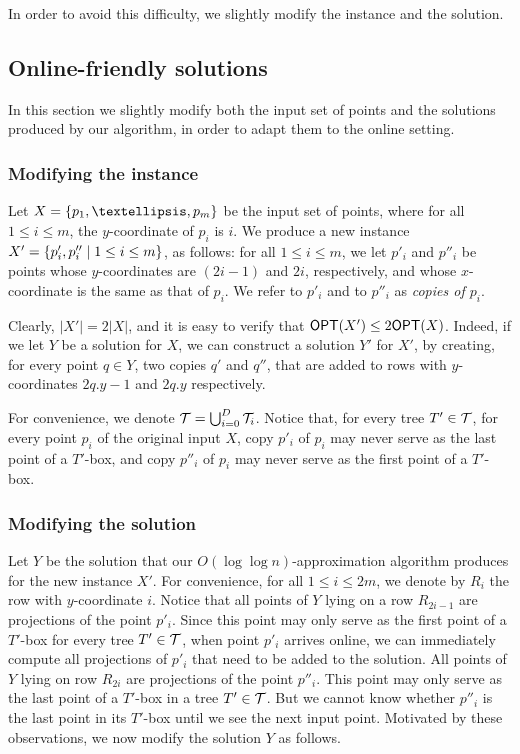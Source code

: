\documentclass[11pt]{article}
\numberwithin{equation}{section}
\theoremstyle{definition}
\theoremstyle{plain}
\begin{document}
In order to avoid this difficulty, we slightly modify the instance and the solution. 


%
%


\subsection{Online-friendly solutions}
\label{sec: online-friendly}

In this section we slightly modify both the input set of points and the solutions produced by our algorithm, in order to adapt them to the online setting.

\subsubsection{Modifying the instance}

Let $X=\set{p_1,\ldots,p_m}$ be the input set of points, where for all $1\leq i\leq m$, the $y$-coordinate of $p_i$ is $i$. We produce a new instance $X'=\left\{ p_i',p_i''\mid 1\leq i\leq m \right\}$, as follows: for all $1\leq i\leq m$, we let $p'_i$ and $p''_i$ be points whose $y$-coordinates are $(2i-1)$ and $2i$, respectively, and whose $x$-coordinate is the same as that of $p_i$. We refer to $p'_i$ and to $p''_i$ as \emph{copies of $p_i$}.
	
	Clearly, $|X'|=2|X|$, and it is easy to verify that $\mbox{\sf OPT}(X')\leq 2\mbox{\sf OPT}(X)$. Indeed, if we let $Y$ be a solution for $X$, we can construct a solution $Y'$ for $X'$, by creating, for every point $q\in Y$, two copies $q'$ and $q''$, that are added to rows with $y$-coordinates $2q.y-1$ and $2q.y$ respectively.

For convenience, we denote ${\mathcal T}=\bigcup_{i=0}^D{\mathcal T}_i$. Notice that, for every tree $T'\in {\mathcal T}$, for every point $p_i$ of the original input $X$, copy $p'_i$ of $p_i$ may never serve as the last point of a $T'$-box, and copy $p''_i$ of $p_i$ may never serve as the first point of a $T'$-box.
	
	
\subsubsection{Modifying the solution}


Let $Y$ be the solution that our $O(\log\log n)$-approximation algorithm produces for the new instance $X'$. For convenience, for all $1\leq i\leq 2m$, we denote by $R_i$ the row with $y$-coordinate $i$. Notice that all points of $Y$ lying on a row $R_{2i-1}$ are projections of the point $p'_i$. Since this point may only serve as the first point of a $T'$-box for every tree $T'\in {\mathcal T}$, when point $p'_i$ arrives online, we can immediately compute all projections of $p'_i$ that need to be added to the solution.
All points of $Y$ lying on row $R_{2i}$ are projections of the point $p''_i$. This point may only serve as the last point of a $T'$-box in a tree $T'\in {\mathcal T}$. But we cannot know whether $p''_i$ is the last point in its $T'$-box until we see the next input point. Motivated by these observations, we now modify the solution $Y$ as follows.
\end{document}
